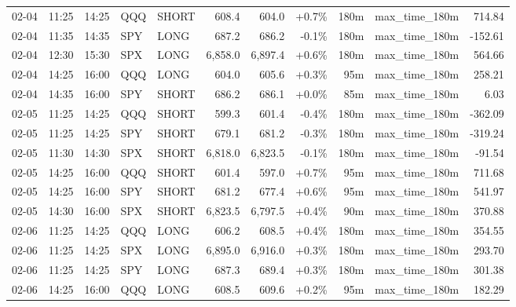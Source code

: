 \documentclass[11pt,a4paper,twoside]{article}
\begin{document}
\begin{center}
\begin{longtable}{>{\color{txtmain}}l l l l l r r r r >{\color{txtmain}}l r}
02-04 & 11:25 & 14:25 & QQQ & SHORT & 608.4 & 604.0 & \textcolor{wingreen}{+0.7\%} & 180m & max\_time\_180m & \textcolor{wingreen}{714.84} \\
02-04 & 11:35 & 14:35 & SPY & LONG & 687.2 & 686.2 & \textcolor{lossred}{-0.1\%} & 180m & max\_time\_180m & \textcolor{lossred}{-152.61} \\
02-04 & 12:30 & 15:30 & SPX & LONG & 6,858.0 & 6,897.4 & \textcolor{wingreen}{+0.6\%} & 180m & max\_time\_180m & \textcolor{wingreen}{564.66} \\
02-04 & 14:25 & 16:00 & QQQ & LONG & 604.0 & 605.6 & \textcolor{wingreen}{+0.3\%} & 95m & max\_time\_180m & \textcolor{wingreen}{258.21} \\
02-04 & 14:35 & 16:00 & SPY & SHORT & 686.2 & 686.1 & \textcolor{wingreen}{+0.0\%} & 85m & max\_time\_180m & \textcolor{wingreen}{6.03} \\
02-05 & 11:25 & 14:25 & QQQ & SHORT & 599.3 & 601.4 & \textcolor{lossred}{-0.4\%} & 180m & max\_time\_180m & \textcolor{lossred}{-362.09} \\
02-05 & 11:25 & 14:25 & SPY & SHORT & 679.1 & 681.2 & \textcolor{lossred}{-0.3\%} & 180m & max\_time\_180m & \textcolor{lossred}{-319.24} \\
02-05 & 11:30 & 14:30 & SPX & SHORT & 6,818.0 & 6,823.5 & \textcolor{lossred}{-0.1\%} & 180m & max\_time\_180m & \textcolor{lossred}{-91.54} \\
02-05 & 14:25 & 16:00 & QQQ & SHORT & 601.4 & 597.0 & \textcolor{wingreen}{+0.7\%} & 95m & max\_time\_180m & \textcolor{wingreen}{711.68} \\
02-05 & 14:25 & 16:00 & SPY & SHORT & 681.2 & 677.4 & \textcolor{wingreen}{+0.6\%} & 95m & max\_time\_180m & \textcolor{wingreen}{541.97} \\
02-05 & 14:30 & 16:00 & SPX & SHORT & 6,823.5 & 6,797.5 & \textcolor{wingreen}{+0.4\%} & 90m & max\_time\_180m & \textcolor{wingreen}{370.88} \\
02-06 & 11:25 & 14:25 & QQQ & LONG & 606.2 & 608.5 & \textcolor{wingreen}{+0.4\%} & 180m & max\_time\_180m & \textcolor{wingreen}{354.55} \\
02-06 & 11:25 & 14:25 & SPX & LONG & 6,895.0 & 6,916.0 & \textcolor{wingreen}{+0.3\%} & 180m & max\_time\_180m & \textcolor{wingreen}{293.70} \\
02-06 & 11:25 & 14:25 & SPY & LONG & 687.3 & 689.4 & \textcolor{wingreen}{+0.3\%} & 180m & max\_time\_180m & \textcolor{wingreen}{301.38} \\
02-06 & 14:25 & 16:00 & QQQ & LONG & 608.5 & 609.6 & \textcolor{wingreen}{+0.2\%} & 95m & max\_time\_180m & \textcolor{wingreen}{182.29} \\

\end{longtable}
\end{center}
\end{document}
